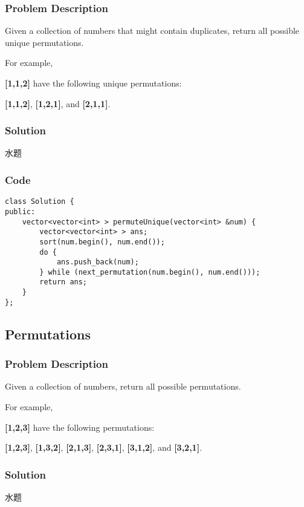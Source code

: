 \documentclass[courier]{article}
\begin{document}
\begin{CJK*}{UTF8}{gkai}
\subsubsection*{Problem Description}
Given a collection of numbers that might contain duplicates, return all possible unique permutations.

For example,


\textbf{[1,1,2]} have the following unique permutations:


\textbf{[1,1,2]}, \textbf{[1,2,1]}, and \textbf{[2,1,1]}.



\subsubsection*{Solution}
水题

\subsubsection*{Code}
\begin{lstlisting}
class Solution {
public:
    vector<vector<int> > permuteUnique(vector<int> &num) {
        vector<vector<int> > ans;
        sort(num.begin(), num.end());
        do {
            ans.push_back(num);
        } while (next_permutation(num.begin(), num.end()));
        return ans;
    }
}; 
\end{lstlisting}


\subsection{ Permutations }

\subsubsection*{Problem Description}
Given a collection of numbers, return all possible permutations.

For example,


\textbf{[1,2,3]} have the following permutations:


\textbf{[1,2,3]}, \textbf{[1,3,2]}, \textbf{[2,1,3]}, \textbf{[2,3,1]}, \textbf{[3,1,2]}, and \textbf{[3,2,1]}.



\subsubsection*{Solution}
水题


\end{CJK*}
\end{document}
